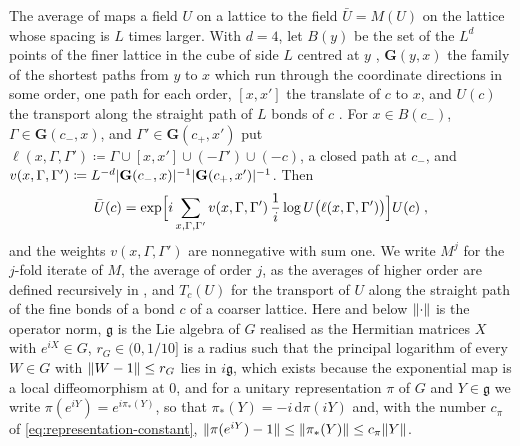 \documentclass[11pt]{preprint}
\newcommand{\dd}{\mathrm{d}}
\DeclarePairedDelimiter{\abs}{\lvert}{\rvert}
\DeclarePairedDelimiter{\norm}{\lVert}{\rVert}
\numberwithin{equation}{section}
\theoremstyle{definition}
\theoremstyle{remark}
\theoremstyle{plain}
\begin{document}
The average of \cite[(0.4), p.~253]{BalabanRG1} maps a field $U$ on a lattice to the field $\bar U = M(U)$ on the lattice whose spacing is $L$ times larger. With $d = 4$, let $B(y)$ be the set of the $L^d$ points of the finer lattice in the cube of side $L$ centred at $y$ \cite[(0.3), p.~252]{BalabanRG1}, $\mathbf G(y, x)$ the family of the shortest paths from $y$ to $x$ which run through the coordinate directions in some order, one path for each order, $[x, x']$ the translate of $c$ to $x$, and $U(c)$ the transport along the straight path of $L$ bonds of $c$ \cite[p.~252]{BalabanRG1}. For $x \in B(c_-)$, $\Gamma \in \mathbf G(c_-, x)$, and $\Gamma' \in \mathbf G(c_+, x')$ put $\ell(x, \Gamma, \Gamma') \coloneqq \Gamma \cup [x, x'] \cup (-\Gamma') \cup (-c)$, a closed path at $c_-$, and $v(x, \Gamma, \Gamma') \coloneqq L^{-d}\abs{\mathbf G(c_-, x)}^{-1}\abs{\mathbf G(c_+, x')}^{-1}$. Then
\begin{equation}\label{eq:average}
    \bar U(c) = \exp\Bigl[i\sum_{x, \Gamma, \Gamma'}v(x, \Gamma, \Gamma')\,\frac1i\log U\bigl(\ell(x, \Gamma, \Gamma')\bigr)\Bigr]U(c)\;,
\end{equation}
and the weights $v(x, \Gamma, \Gamma')$ are nonnegative with sum one. We write $M^j$ for the $j$-fold iterate of $M$, the average of order $j$, as the averages of higher order are defined recursively in \cite[(43), p.~24]{BalabanAVG}, and $T_c(U)$ for the transport of $U$ along the straight path of the fine bonds of a bond $c$ of a coarser lattice. Here and below $\norm{\cdot}$ is the operator norm, $\mathfrak g$ is the Lie algebra of $G$ realised as the Hermitian matrices $X$ with $e^{iX} \in G$, $r_G \in (0, 1/10]$ is a radius such that the principal logarithm of every $W \in G$ with $\norm{W - 1} \leq r_G$ lies in $i\mathfrak g$, which exists because the exponential map is a local diffeomorphism at $0$, and for a unitary representation $\pi$ of $G$ and $Y \in \mathfrak g$ we write $\pi(e^{iY}) = e^{i\pi_*(Y)}$, so that $\pi_*(Y) = -i\,\dd\pi(iY)$ and, with the number $c_\pi$ of \eqref{eq:representation-constant}, $\norm{\pi(e^{iY}) - 1} \leq \norm{\pi_*(Y)} \leq c_\pi\norm{Y}$.
\end{document}
